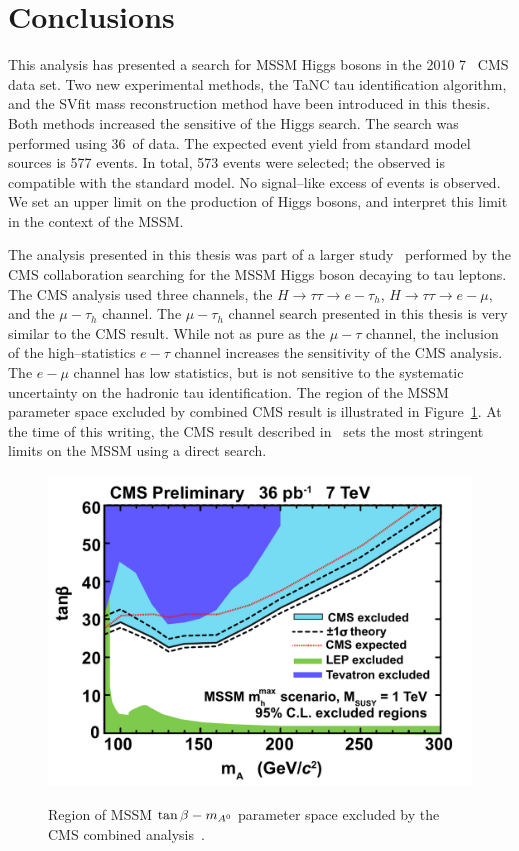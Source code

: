 \ifx\master\undefined\fi
%
\chapter*{Conclusions}
\label{ch:conclusions}

This analysis has presented a search for MSSM Higgs bosons in the 2010 7~\TeV
CMS data set. Two new experimental methods, the TaNC tau identification
algorithm, and the SVfit mass reconstruction method have been introduced in this
thesis.  Both methods increased the sensitive of the Higgs search.  The search
was performed using 36~\pbinv of data.  The expected event yield from standard
model sources is 577 events. In total, 573 events were selected; the observed is
compatible with the standard model.  No signal--like excess of events is
observed.  We set an upper limit on the production of Higgs bosons, and
interpret this limit in the context of the MSSM.

The analysis presented in this thesis was part of a larger
study~\cite{HIG-10-002} performed by the CMS collaboration searching for the
MSSM Higgs boson decaying to tau leptons.  The CMS analysis used three channels,
the $H \to \tau \tau \to e-\tau_h$, $H \to \tau \tau \to e-\mu$, and the
$\mu-\tau_h$ channel.  The $\mu-\tau_h$ channel search presented in this thesis
is very similar to the CMS result.  While not as pure as the $\mu-\tau$ channel,
the inclusion of the high--statistics $e-\tau$ channel increases the sensitivity
of the CMS analysis.  The $e-\mu$ channel has low statistics, but is not
sensitive to the systematic uncertainty on the hadronic tau identification.  The
region of the MSSM parameter space excluded by combined CMS result is
illustrated in Figure~\ref{fig:CMSTanBetaExclusion}.  At the time of this
writing, the CMS result described in~\cite{HIG-10-002} sets the most stringent
limits on the MSSM using a direct search.  
%
\begin{figure}[htb]
  \centering
  \includegraphics[width=\textwidth]{conclusions_chapter/figures/tanbeta-ma-LEP-Tev.pdf}
  \label{fig:CMSTanBetaExclusion} 
  \caption[CMS combined exclusion of MSSM $\tb-\ma$ parameter space]{Region of MSSM
  $\tb-\ma$ parameter space excluded by the CMS combined
  analysis~\cite{HIG-10-002}.}
\end{figure}

\ifx\master\undefined\fi
